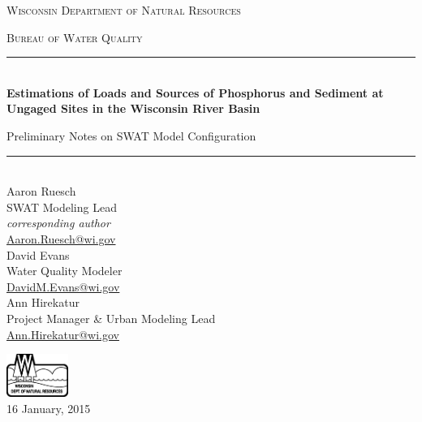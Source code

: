 \begin{titlepage}
\begin{center}
	\bigskip
	\textsc{ \Large  Wisconsin Department of Natural Resources}\par
	\medskip
	\textsc{ \Large Bureau of Water Quality}\par
	\bigskip
	\rule{\linewidth}{0.5mm} \\[0.4cm]
	\textbf{\Large Estimations of Loads and Sources of Phosphorus and Sediment at Ungaged Sites in the Wisconsin River Basin}\par
	\medskip
	{\Large Preliminary Notes on SWAT Model Configuration}\par
	\rule{\linewidth}{0.5mm} \\[0.4cm]
	\bigskip
	\noindent
	Aaron Ruesch \\
	SWAT Modeling Lead \\
	\textit{corresponding author} \\
	\href{mailto:Aaron.Ruesch@wi.gov}{Aaron.Ruesch@wi.gov} \\
	\medskip
	David Evans \\
	Water Quality Modeler \\
	\href{mailto:DavidM.Evans@wi.gov}{DavidM.Evans@wi.gov} \\
	\medskip
	Ann Hirekatur \\
	Project Manager \& Urban Modeling Lead \\
	\href{mailto:Ann.Hirekatur@wi.gov}{Ann.Hirekatur@wi.gov} \\

	\vfill
	
	\includegraphics[width=0.15\textwidth]{./img/DNR2.eps} \\
	\medskip
	{\large 16 January, 2015}
	
\end{center}
\end{titlepage}

